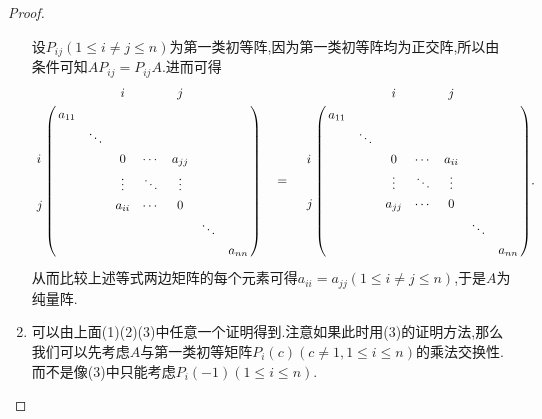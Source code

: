 \documentclass[lang=cn,newtx,10pt,scheme=chinese]{elegantbook}
\begin{document}
\begin{proof}
\begin{enumerate}
    设\(P_{ij}(1\leq i\neq j\leq n)\)为第一类初等阵,因为第一类初等阵均为正交阵,所以由条件可知\(AP_{ij}=P_{ij}A\).进而可得
\begin{align*}
     \bordermatrix{%
    &    &		&		i&		&		j&		&		\cr
    &    a_{11}&		&		&		&		&		&		\cr
    &    &		\ddots&		&		&		&		&		\cr
    i&    &		&		0&		\cdots&		a_{jj}&		&		\cr
    &   &		&		\vdots&		\ddots&		\vdots&		&		\cr
    j&    &		&		a_{ii}&		\cdots&		0&		&		\cr
    &    &		&		&		&		&		\ddots&		\cr
    &    &		&		&		&		&		&		a_{nn}\cr
    } \quad =\quad \bordermatrix{%
    &    &		&		i&		&		j&		&		\cr
    &    a_{11}&		&		&		&		&		&		\cr
    &    &		\ddots&		&		&		&		&		\cr
    i&    &		&		0&		\cdots&		a_{ii}&		&		\cr
    &    &		&		\vdots&		\ddots&		\vdots&		&		\cr
    j&   &		&		a_{jj}&		\cdots&		0&		&		\cr
    &    &		&		&		&		&		\ddots&		\cr
    &    &		&		&		&		&		&		a_{nn}\cr
     } .
\end{align*}
从而比较上述等式两边矩阵的每个元素可得\(a_{ii}=a_{jj}(1\leq i\neq j\leq n)\),于是\(A\)为纯量阵.

\item 可以由上面(1)(2)(3)中任意一个证明得到.注意如果此时用(3)的证明方法,那么我们可以先考虑$A$与第一类初等矩阵\(P_{i}(c)(c\ne 1,1\leq i\leq n)\)的乘法交换性.而不是像(3)中只能考虑\(P_{i}(-1)(1\leq i\leq n)\).
\end{enumerate}
\end{proof}
\end{document}
